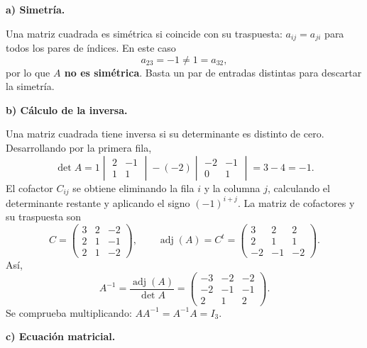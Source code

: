\textbf{a) Simetría.}\par\nopagebreak[4]

Una matriz cuadrada es simétrica si coincide con su traspuesta: $a_{ij}=a_{ji}$ para todos los pares de índices. En este caso
\[
a_{23}=-1\ne1=a_{32},
\]
por lo que \textbf{$A$ no es simétrica}. Basta un par de entradas distintas para descartar la simetría.

\textbf{b) Cálculo de la inversa.}\par\nopagebreak[4]

Una matriz cuadrada tiene inversa si su determinante es distinto de cero. Desarrollando por la primera fila,
\[
\det A=1\begin{vmatrix}2&-1\\1&1\end{vmatrix}
-(-2)\begin{vmatrix}-2&-1\\0&1\end{vmatrix}
=3-4=-1.
\]
El cofactor $C_{ij}$ se obtiene eliminando la fila $i$ y la columna $j$, calculando el determinante restante y aplicando el signo $(-1)^{i+j}$. La matriz de cofactores y su traspuesta son
\[
C=\begin{pmatrix}3&2&-2\\2&1&-1\\2&1&-2\end{pmatrix},
\qquad
\operatorname{adj}(A)=C^t=\begin{pmatrix}3&2&2\\2&1&1\\-2&-1&-2\end{pmatrix}.
\]
Así,
\[
\boxed{A^{-1}=\frac{\operatorname{adj}(A)}{\det A}
=\begin{pmatrix}-3&-2&-2\\-2&-1&-1\\2&1&2\end{pmatrix}.}
\]
Se comprueba multiplicando: $AA^{-1}=A^{-1}A=I_3$.

\textbf{c) Ecuación matricial.}\par\nopagebreak[4]

